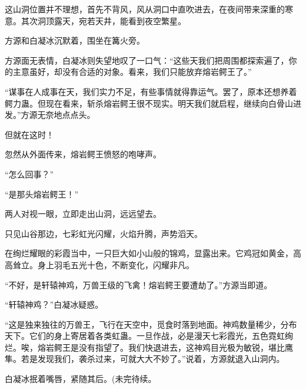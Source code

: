 \begin{this_body}
这山洞位置并不理想，首先不背风，风从洞口中直吹进去，在夜间带来深重的寒意。其次洞顶露天，宛若天井，能看到夜空繁星。

方源和白凝冰沉默着，围坐在篝火旁。

方源面无表情，白凝冰则失望地叹了一口气：“这些天我们把周围都探索遍了，你的主意虽好，却没有合适的对象。看来，我们只能放弃熔岩鳄王了。”

“谋事在人成事在天，我们实力不足，有些事情就得靠运气。罢了，原本还想养着鳄力蛊。但现在看来，斩杀熔岩鳄王很不现实。明天我们就启程，继续向白骨山进发。”方源无奈地点点头。

但就在这时！

忽然从外面传来，熔岩鳄王愤怒的咆哮声。

“怎么回事？”

“是那头熔岩鳄王！”

两人对视一眼，立即走出山洞，远远望去。

只见山谷那边，七彩虹光闪耀，火焰升腾，声势滔天。

在绚烂耀眼的彩霞当中，一只巨大如小山般的锦鸡，显露出来。它鸡冠如黄金，高高耸立。身上羽毛五光十色，不断变化，闪耀非凡。

“不好，是轩辕神鸡，万兽王级的飞禽！熔岩鳄王要遭劫了。”方源当即道。

“轩辕神鸡？”白凝冰疑惑。

“这是独来独往的万兽王，飞行在天空中，觅食时落到地面。神鸡数量稀少，分布天下。它们的身上寄居着各类虹蛊。一旦作战，必是漫天七彩霞光，五色霓虹绚烂。唉，熔岩鳄王是没有指望了。我们快退进去，这神鸡目光极为敏锐，堪比鹰隼。若是发现我们，袭杀过来，可就大大不妙了。”说着，方源就退入山洞内。

白凝冰抿着嘴唇，紧随其后。(未完待续。

\end{this_body}

